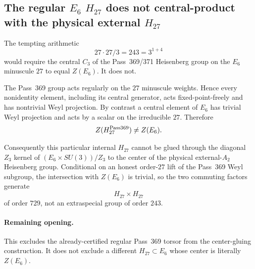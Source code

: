 \subsection*{The regular $E_6$ $H_{27}$ does not central-product with the physical external $H_{27}$}

The tempting arithmetic
\[
27\cdot27/3=243=3^{1+4}
\]
would require the central $C_3$ of the Pass~369/371 Heisenberg group on the
$E_6$ minuscule $27$ to equal $Z(E_6)$.  It does not.

The Pass~369 group acts regularly on the $27$ minuscule weights.  Hence every
nonidentity element, including its central generator, acts fixed-point-freely
and has nontrivial Weyl projection.  By contrast a central element of $E_6$
has trivial Weyl projection and acts by a scalar on the irreducible $27$.
Therefore
\[
Z(H_{27}^{\rm Pass369})\neq Z(E_6).
\]

Consequently this particular internal $H_{27}$ cannot be glued through the
diagonal $Z_3$ kernel of $(E_6\times SU(3))/Z_3$ to the center of the physical
external-$A_2$ Heisenberg group.  Conditional on an honest order-$27$ lift of
the Pass~369 Weyl subgroup, the intersection with $Z(E_6)$ is trivial, so the
two commuting factors generate
\[
\boxed{H_{27}\times H_{27}}
\]
of order $729$, not an extraspecial group of order $243$.

\paragraph{Remaining opening.}
This excludes the already-certified regular Pass~369 torsor from the
center-gluing construction.  It does not exclude a different $H_{27}\subset
E_6$ whose center is literally $Z(E_6)$.
